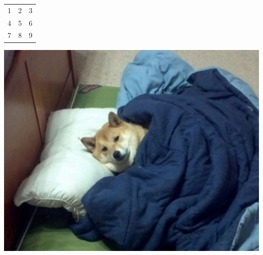 \documentclass{article}
\begin{document}
\begin{center}
\begin{tabular}{|c|c|c|}
1 & 2 & 3\\
4 & 5 & 6\\
7 & 8 & 9\\
\end{tabular}
\end{center}\n\includegraphics{artifacts/image.jpg}
\end{document}
